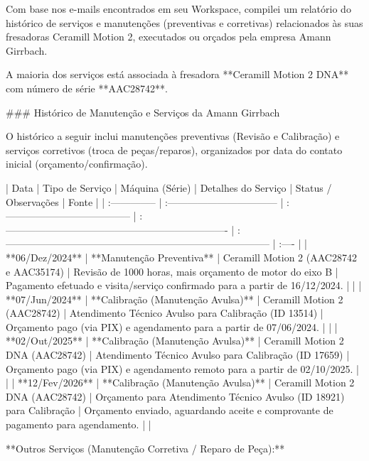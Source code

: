 Com base nos e-mails encontrados em seu Workspace, compilei um relatório do histórico de serviços e manutenções (preventivas e corretivas) relacionados às suas fresadoras Ceramill Motion 2, executados ou orçados pela empresa Amann Girrbach.

A maioria dos serviços está associada à fresadora **Ceramill Motion 2 DNA** com número de série **AAC28742**.

### Histórico de Manutenção e Serviços da Amann Girrbach

O histórico a seguir inclui manutenções preventivas (Revisão e Calibração) e serviços corretivos (troca de peças/reparos), organizados por data do contato inicial (orçamento/confirmação).

| Data            | Tipo de Serviço                    | Máquina (Série)                         | Detalhes do Serviço                                                  | Status / Observações                                                              | Fonte |
| :-------------- | :--------------------------------- | :-------------------------------------- | :------------------------------------------------------------------- | :-------------------------------------------------------------------------------- | :---- |
| **06/Dez/2024** | **Manutenção Preventiva**          | Ceramill Motion 2 (AAC28742 e AAC35174) | Revisão de 1000 horas, mais orçamento de motor do eixo B             | Pagamento efetuado e visita/serviço confirmado para a partir de 16/12/2024.       |       |
| **07/Jun/2024** | **Calibração (Manutenção Avulsa)** | Ceramill Motion 2 (AAC28742)            | Atendimento Técnico Avulso para Calibração (ID 13514)                | Orçamento pago (via PIX) e agendamento para a partir de 07/06/2024.               |       |
| **02/Out/2025** | **Calibração (Manutenção Avulsa)** | Ceramill Motion 2 DNA (AAC28742)        | Atendimento Técnico Avulso para Calibração (ID 17659)                | Orçamento pago (via PIX) e agendamento remoto para a partir de 02/10/2025.        |       |
| **12/Fev/2026** | **Calibração (Manutenção Avulsa)** | Ceramill Motion 2 DNA (AAC28742)        | Orçamento para Atendimento Técnico Avulso (ID 18921) para Calibração | Orçamento enviado, aguardando aceite e comprovante de pagamento para agendamento. |       |

**Outros Serviços (Manutenção Corretiva / Reparo de Peça):**

